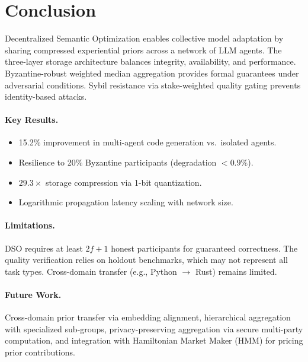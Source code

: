 \section{Conclusion}

\label{sec:conclusion}

Decentralized Semantic Optimization enables collective model adaptation by
sharing compressed experiential priors across a network of LLM agents. The
three-layer storage architecture balances integrity, availability, and
performance. Byzantine-robust weighted median aggregation provides formal
guarantees under adversarial conditions. Sybil resistance via stake-weighted
quality gating prevents identity-based attacks.

\paragraph{Key Results.}
\begin{itemize}[leftmargin=1.5em]
    \item 15.2\% improvement in multi-agent code generation vs.\ isolated agents.
    \item Resilience to 20\% Byzantine participants (degradation $< 0.9\%$).
    \item $29.3\times$ storage compression via 1-bit quantization.
    \item Logarithmic propagation latency scaling with network size.
\end{itemize}

\paragraph{Limitations.}
DSO requires at least $2f + 1$ honest participants for guaranteed correctness.
The quality verification relies on holdout benchmarks, which may not represent
all task types. Cross-domain transfer (e.g., Python $\to$ Rust) remains limited.

\paragraph{Future Work.}
Cross-domain prior transfer via embedding alignment, hierarchical aggregation
with specialized sub-groups, privacy-preserving aggregation via secure
multi-party computation, and integration with Hamiltonian Market Maker (HMM) for
pricing prior contributions.

\appendix

